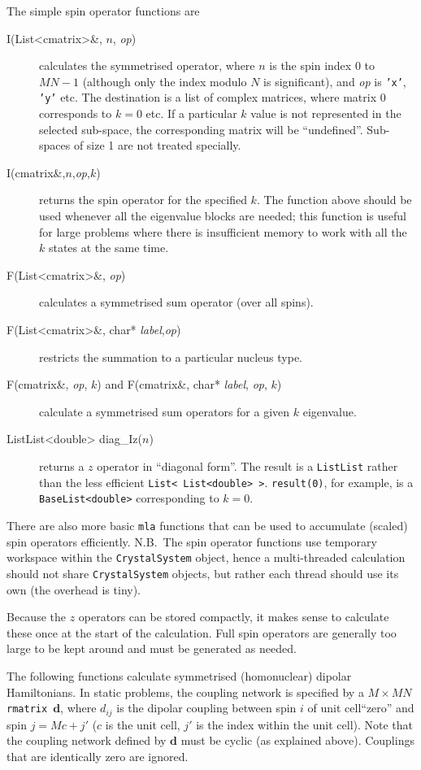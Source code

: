 \documentclass[11pt,a4paper]{article}
\newcommand{\bs}{\boldsymbol}
\newcommand{\rmx}{{\tt rmatrix}}
\begin{document}
The simple spin operator functions are
\begin{description}
\item[I(List<cmatrix>\&, $n$, {\it op})] calculates the symmetrised
operator, where $n$ is the spin index $0$ to $MN-1$ (although only
the index modulo $N$ is significant), and {\it op} is {\tt 'x'}, {\tt 'y'}
etc.  The destination is a list of complex matrices, where matrix 0
corresponds to $k=0$ etc.  If a particular $k$ value is not represented
in the selected sub-space, the corresponding matrix will be ``undefined''.
Sub-spaces of size 1 are not treated specially.
\item[I(cmatrix\&,$n$,{\it op},$k$)] returns the spin operator for the specified $k$.
The function above should be used whenever all the eigenvalue blocks are
needed; this function is useful for large problems where there is insufficient
memory to work with all the $k$ states at the same time.
\item[F(List<cmatrix>\&, {\it op})] calculates a symmetrised sum operator (over all spins).
\item[F(List<cmatrix>\&, char* {\it label},{\it op})] restricts the summation to a particular nucleus type.
\item[F(cmatrix\&, {\it op}, $k$) {\rm and} F(cmatrix\&, char* {\it label}, {\it op}, $k$)] calculate a symmetrised sum operators for a given $k$ eigenvalue.
\item[ListList<double> diag\_Iz($n$)] returns a $z$ operator in
``diagonal form''.  The result is a {\tt ListList} rather than the
less efficient {\tt List< List<double> >}.  {\tt result(0)}, for example,
is a {\tt BaseList<double>} corresponding to $k=0$.
\end{description}
There are also more basic {\tt mla} functions that can be used to 
accumulate (scaled) spin operators efficiently.
N.B.\ The spin operator functions use temporary workspace within the {\tt CrystalSystem}
object, hence a multi-threaded calculation should not share
{\tt CrystalSystem} objects, but rather each thread should use its own (the overhead
is tiny).

Because the $z$ operators can be stored compactly, it makes sense
to calculate these once at the start of the calculation.  Full spin operators
are generally too large to be kept around and must be generated as needed.

The following functions calculate symmetrised (homonuclear) dipolar Hamiltonians.
In static problems, the coupling network is specified by a $M \times MN$  \rmx\, $\bs{d}$,
where $d_{ij}$ is the dipolar coupling between spin $i$ of unit cell``zero'' and
spin $j= M c + j'$ ($c$ is the unit cell, $j'$ is the index within the unit cell). 
Note that the coupling network defined by $\bs{d}$ must be cyclic (as explained above).  Couplings that are identically zero are ignored.
\end{document}
